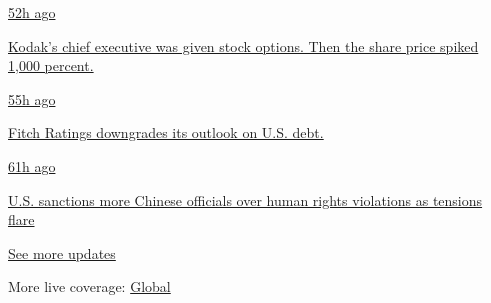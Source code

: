 \href{https://www.nytimes3xbfgragh.onion/live/2020/07/31/business/stock-market-today-coronavirus?action=click\&pgtype=Article\&state=default\&region=MAIN_CONTENT_1\&context=storylines_live_updates\#kodaks-chief-executive-was-given-stock-options-then-the-share-price-spiked-1000-percent}{52h
ago}

\href{https://www.nytimes3xbfgragh.onion/live/2020/07/31/business/stock-market-today-coronavirus?action=click\&pgtype=Article\&state=default\&region=MAIN_CONTENT_1\&context=storylines_live_updates\#kodaks-chief-executive-was-given-stock-options-then-the-share-price-spiked-1000-percent}{Kodak's
chief executive was given stock options. Then the share price spiked
1,000 percent.}

\href{https://www.nytimes3xbfgragh.onion/live/2020/07/31/business/stock-market-today-coronavirus?action=click\&pgtype=Article\&state=default\&region=MAIN_CONTENT_1\&context=storylines_live_updates\#fitch-ratings-downgrades-its-outlook-on-us-debt}{55h
ago}

\href{https://www.nytimes3xbfgragh.onion/live/2020/07/31/business/stock-market-today-coronavirus?action=click\&pgtype=Article\&state=default\&region=MAIN_CONTENT_1\&context=storylines_live_updates\#fitch-ratings-downgrades-its-outlook-on-us-debt}{Fitch
Ratings downgrades its outlook on U.S. debt.}

\href{https://www.nytimes3xbfgragh.onion/live/2020/07/31/business/stock-market-today-coronavirus?action=click\&pgtype=Article\&state=default\&region=MAIN_CONTENT_1\&context=storylines_live_updates\#us-sanctions-more-chinese-officials-over-human-rights-violations-as-tensions-flare}{61h
ago}

\href{https://www.nytimes3xbfgragh.onion/live/2020/07/31/business/stock-market-today-coronavirus?action=click\&pgtype=Article\&state=default\&region=MAIN_CONTENT_1\&context=storylines_live_updates\#us-sanctions-more-chinese-officials-over-human-rights-violations-as-tensions-flare}{U.S.
sanctions more Chinese officials over human rights violations as
tensions flare}

\href{https://www.nytimes3xbfgragh.onion/live/2020/07/31/business/stock-market-today-coronavirus?action=click\&pgtype=Article\&state=default\&region=MAIN_CONTENT_1\&context=storylines_live_updates}{See
more updates}

More live coverage:
\href{https://www.nytimes3xbfgragh.onion/2020/08/01/world/coronavirus-covid-19.html?action=click\&pgtype=Article\&state=default\&region=MAIN_CONTENT_1\&context=storylines_live_updates}{Global}

